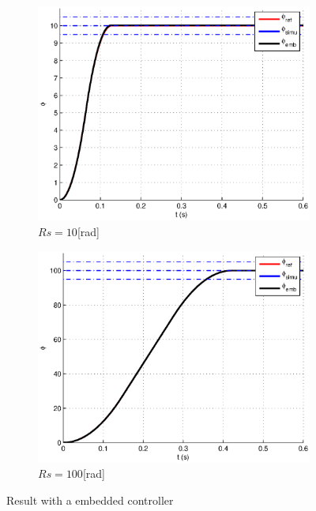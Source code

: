 \begin{figure}[ht]
  \centering
  \begin{subfigure}[b]{\linewidth}
   \includegraphics[width=\columnwidth]{fig/embeddedlvl110.eps}
   \caption{$Rs = 10$[rad]}
  \end{subfigure}
  \begin{subfigure}[b]{\linewidth}
  \includegraphics[width=\columnwidth]{fig/embeddedlvl1100.eps}
   \caption{$Rs = 100$[rad]}
  \end{subfigure}

 \caption{Result with a embedded controller}
 \label{embedded}
\end{figure}

